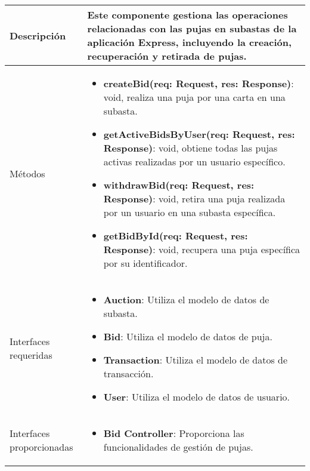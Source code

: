 \begin{longtable}{
    >{\columncolor{lightgreen!20}}p{4cm}
    p{12cm}
    }
    \midrule
    Descripción & Este componente gestiona las operaciones relacionadas con las pujas en subastas de la aplicación Express, incluyendo la creación, recuperación y retirada de pujas. \\
    \midrule
    Métodos & \begin{itemize}[nosep,leftmargin=*]
      \item \textbf{createBid(req: Request, res: Response)}: void, realiza una puja por una carta en una subasta.
      \item \textbf{getActiveBidsByUser(req: Request, res: Response)}: void, obtiene todas las pujas activas realizadas por un usuario específico.
      \item \textbf{withdrawBid(req: Request, res: Response)}: void, retira una puja realizada por un usuario en una subasta específica.
      \item \textbf{getBidById(req: Request, res: Response)}: void, recupera una puja específica por su identificador.
    \end{itemize} \\
    \midrule
    Interfaces requeridas & \begin{itemize}[nosep,leftmargin=*]
      \item \textbf{Auction}: Utiliza el modelo de datos de subasta.
      \item \textbf{Bid}: Utiliza el modelo de datos de puja.
      \item \textbf{Transaction}: Utiliza el modelo de datos de transacción.
      \item \textbf{User}: Utiliza el modelo de datos de usuario.
    \end{itemize} \\
    \midrule
    Interfaces proporcionadas & \begin{itemize}[nosep,leftmargin=*]
      \item \textbf{Bid Controller}: Proporciona las funcionalidades de gestión de pujas.
    \end{itemize} \\
\end{longtable}

